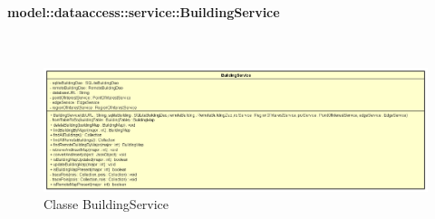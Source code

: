 \documentclass[../DefinizioneDiProdotto.tex]{subfiles}
\begin{document}
\paragraph{model::dataaccess::service::BuildingService}
\
\begin{figure}[H]
	\centering
	\includegraphics[width=\maxwidth]{img/BuildingService.png}
	\caption{Classe BuildingService}\label{fig:model::dataaccess::service::BuildingService} 
\end{figure}
\end{document}
